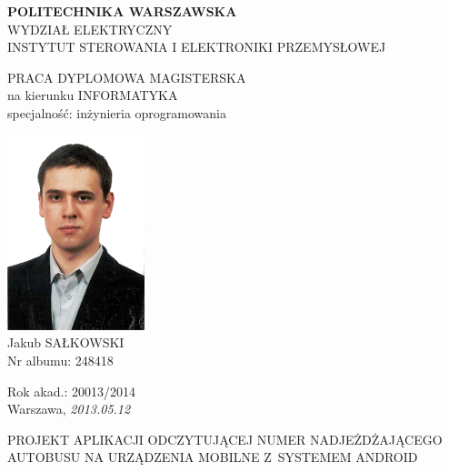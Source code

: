\documentclass[a4paper,onecolumn,oneside,12pt]{mwrep}
\begin{document}
\begin{titlepage}
	\begin{center}
	    \fontsize{14pt}{12px}\selectfont
        \textbf{POLITECHNIKA WARSZAWSKA} \\
        WYDZIAŁ ELEKTRYCZNY \\
        INSTYTUT STEROWANIA I ELEKTRONIKI PRZEMYSŁOWEJ
        
	    \vspace*{.6\baselineskip}
	    
	    \fontsize{12pt}{10pt}\selectfont
	    PRACA DYPLOMOWA MAGISTERSKA \\
        na kierunku INFORMATYKA \\
        specjalność: inżynieria oprogramowania
	\end{center}
	
	\begin{flushleft}
        \includegraphics[width=4cm]{img/zdjecie_dyplo.png} \\
	    \fontsize{14pt}{12px}\selectfont
        Jakub SAŁKOWSKI \\
	    \fontsize{12pt}{10pt}\selectfont
        Nr albumu: 248418
    \end{flushleft}
	
	\begin{flushright}
    	\begin{minipage}{0.3\textwidth}
    	    \fontsize{12pt}{10pt}\selectfont
    	    Rok akad.: 20013/2014 \\		
    	    \fontsize{10pt}{8pt}\selectfont
            Warszawa, \textit{2013.05.12}
        \end{minipage}
	\end{flushright}
	
	\vspace*{1\baselineskip}
	    
	\begin{center}
	    \fontsize{14pt}{12pt}\selectfont
	    PROJEKT APLIKACJI ODCZYTUJĄCEJ NUMER 
	    NADJEŻDŻAJĄCEGO AUTOBUSU NA URZĄDZENIA
	    MOBILNE Z~SYSTEMEM ANDROID \\
	\end{center}
	

\end{titlepage}
\end{document}
